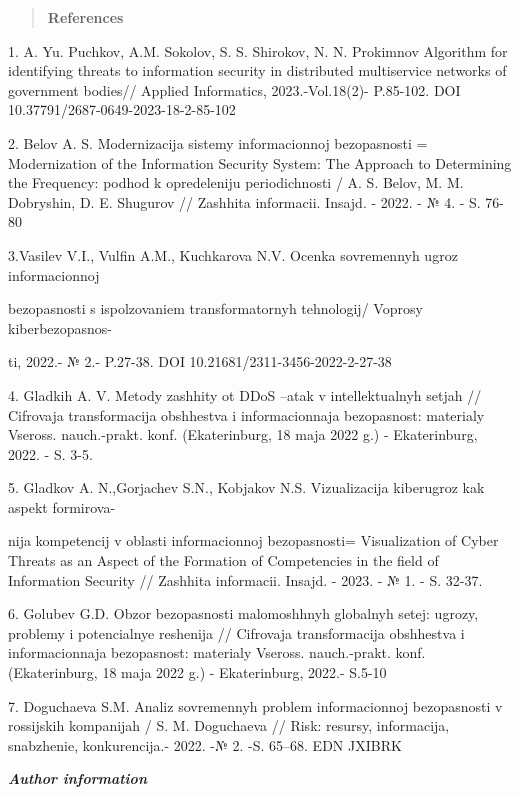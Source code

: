 \begin{quote}
\textbf{References}
\end{quote}

1. A. Yu. Puchkov, A.M. Sokolov, S. S. Shirokov, N. N. Prokimnov
Algorithm for identifying threats to information security in distributed
multiservice networks of government bodies// Applied Informatics,
2023.-Vol.18(2)- P.85-102. DOI 10.37791/2687-0649-2023-18-2-85-102

2. Belov A. S. Modernizacija sistemy informacionnoj bezopasnosti =
Modernization of the Information Security System: The Approach to
Determining the Frequency: podhod k opredeleniju periodichnosti / A. S.
Belov, M. M. Dobryshin, D. E. Shugurov // Zashhita informacii. Insajd. -
2022. - № 4. - S. 76-80

3.Vasil\textquotesingle ev V.I., Vul\textquotesingle fin A.M.,
Kuchkarova N.V. Ocenka sovremennyh ugroz informacionnoj

bezopasnosti s ispol\textquotesingle zovaniem transformatornyh
tehnologij/ Voprosy kiberbezopasnos-

ti, 2022.- № 2.- P.27-38. DOI 10.21681/2311-3456-2022-2-27-38

4. Gladkih A. V. Metody zashhity ot DDoS --atak v
intellektual\textquotesingle nyh setjah // Cifrovaja transformacija
obshhestva i informacionnaja bezopasnost\textquotesingle: materialy
Vseross. nauch.-prakt. konf. (Ekaterinburg, 18 maja 2022 g.) -
Ekaterinburg, 2022. - S. 3-5.

5. Gladkov A. N.,Gorjachev S.N., Kobjakov N.S. Vizualizacija kiberugroz
kak aspekt formirova-

nija kompetencij v oblasti informacionnoj bezopasnosti= Visualization of
Cyber Threats as an Aspect of the Formation of Competencies in the field
of Information Security // Zashhita informacii. Insajd. - 2023. - № 1. -
S. 32-37.

6. Golubev G.D. Obzor bezopasnosti malomoshhnyh
global\textquotesingle nyh setej: ugrozy, problemy i
potencial\textquotesingle nye reshenija // Cifrovaja transformacija
obshhestva i informacionnaja bezopasnost\textquotesingle: materialy
Vseross. nauch.-prakt. konf. (Ekaterinburg, 18 maja 2022 g.) -
Ekaterinburg, 2022.- S.5-10

7. Doguchaeva S.M. Analiz sovremennyh problem informacionnoj
bezopasnosti v rossijskih kompanijah / S. M. Doguchaeva // Risk:
resursy, informacija, snabzhenie, konkurencija.- 2022. -№ 2. -S. 65--68.
EDN JXIBRK~

\emph{\textbf{Author information}}


